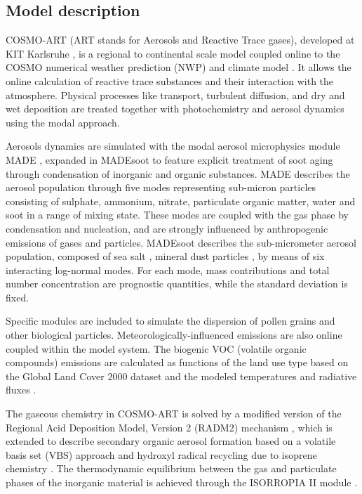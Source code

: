 \subsection{Model description}
\label{subsec:1.1}
COSMO-ART  (ART  stands  for   Aerosols  and  Reactive  Trace  gases),
developed  at  KIT  Karlsruhe  \citep{Vogel-2009}, is  a  regional  to
continental scale model coupled  online to the COSMO numerical weather
prediction (NWP) and climate model \citep{Baldauf-2011}. It allows the
online calculation of reactive  trace substances and their interaction
with  the atmosphere.   Physical processes  like  transport, turbulent
diffusion,  and  dry and  wet  deposition  are  treated together  with
photochemistry and aerosol dynamics using the modal approach.

Aerosols dynamics  are simulated  with the modal  aerosol microphysics
module  MADE \citep{Ackermann-1998}, expanded  in MADEsoot  to feature
explicit  treatment of  soot aging  through condensation  of inorganic
\citep{Riemer-2003} and organic substances. MADE describes the aerosol
population  through  five   modes  representing  sub-micron  particles
consisting of sulphate, ammonium, nitrate, particulate organic matter,
water and soot  \citep{Riemer-2004} in a range of  mixing state. These
modes are coupled  with the gas phase by  condensation and nucleation,
and are  strongly influenced by  anthropogenic emissions of  gases and
particles. MADEsoot  describes the sub-micrometer  aerosol population,
composed  of sea  salt \citep{Lundgren-2013},  mineral  dust particles
\citep{Vogel-2006,  Stanelle-2010},   by  means  of   six  interacting
log-normal modes.  For each  mode, mass contributions and total number
concentration are prognostic  quantities, while the standard deviation
is fixed.

Specific  modules are included  to simulate  the dispersion  of pollen
grains    \citep{Vogel-2008}   and    other    biological   particles.
Meteorologically-influenced emissions  are also online  coupled within
the  model  system.  The  biogenic  VOC  (volatile organic  compounds)
emissions are  calculated as functions of  the land use  type based on
the Global  Land Cover 2000  dataset and the modeled  temperatures and
radiative fluxes \citep{Vogel-1995}.

The gaseous chemistry in COSMO-ART  is solved by a modified version of
the  Regional  Acid  Deposition  Model, Version  2  (RADM2)  mechanism
\citep{Stockwell-1990},  which  is   extended  to  describe  secondary
organic aerosol formation based on a volatile basis set (VBS) approach
\citep{Athanasopoulou-2013}  and  hydroxyl  radical recycling  due  to
isoprene chemistry \citep{Geiger-2003}.  The thermodynamic equilibrium
between the  gas and particulate  phases of the inorganic  material is
achieved through the  ISORROPIA II module \citep{Fountoukis-2007}. 

